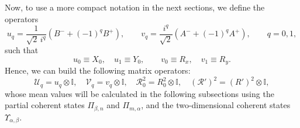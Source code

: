 \documentclass[aps,showpacs,showkeys]{revtex4}
\begin{document}
Now, to use a more compact notation in the next sections, we define the operators~\cite{diaz20}
	\begin{equation}\label{operatorsuv}
		u_{q}=\frac{1}{\sqrt{2}\, i^{q}}(B^{-}+(-1)^{q}B^{+}), \qquad v_{q}=\frac{i^{q}}{\sqrt{2}}(A^{-}+(-1)^{q}A^{+}), \qquad q=0,1,
	\end{equation}
such that
	\begin{equation}
		u_{0}\equiv X_{0}, \quad u_{1}\equiv Y_{0}, \qquad v_{0}\equiv R_{x}, \quad v_{1}\equiv R_{y}.
	\end{equation}
Hence, we can build the following matrix operators:
	\begin{equation}\label{matrixoperators}
		\mathcal{U}_{q}=u_{q}\otimes\mathbb{I}, \quad
		\mathcal{V}_{q}=v_{q}\otimes\mathbb{I}, \quad 
		\mathcal{R}_{0}^{2}=R_{0}^{2}\otimes\mathbb{I}, \quad (\mathcal{R'})^{2}=(R')^{2}\otimes\mathbb{I},
	\end{equation}
whose mean values will be calculated in the following subsections using the partial coherent states  $\Pi_{\beta,n}$ and 
$\Pi_{m,\alpha}$, and the two-dimensional coherent states $\Upsilon_{\alpha,\beta}$.
\end{document}
